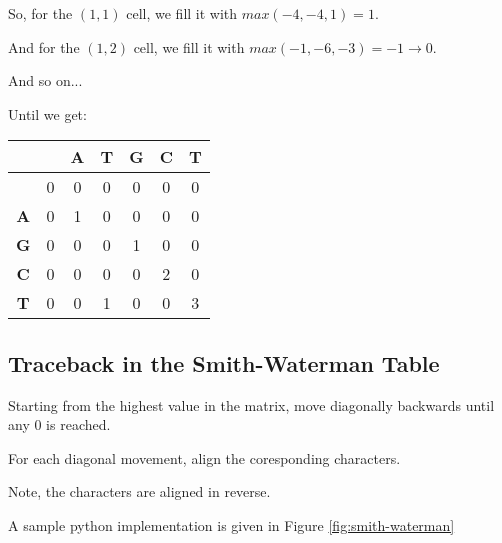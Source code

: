 So, for the $(1,1)$ cell, we fill it with $max(-4,-4,1) = 1$.

And for the $(1,2)$ cell, we fill it with $max(-1,-6,-3) = -1 \rightarrow 0$.

And so on...

Until we get:

\begin{table}[htbp]
    \centering
    \begin{tabular}{|c|c|c|c|c|c|c|}
        \hline
          &  & \textbf{A} & \textbf{T} & \textbf{G} & \textbf{C} & \textbf{T} \\
        \hline
        & 0 & 0 & 0 & 0 & 0 & 0 \\
        \hline
        \textbf{A} & 0 & 1 & 0 & 0 & 0 & 0 \\
        \hline
        \textbf{G} & 0 & 0 & 0 & 1 & 0 & 0 \\
        \hline
        \textbf{C} & 0 & 0 & 0 & 0 & 2 & 0 \\
        \hline
        \textbf{T} & 0 & 0 & 1 & 0 & 0 & 3 \\
        \hline
    \end{tabular}
\end{table}

\subsection{Traceback in the Smith-Waterman Table}

Starting from the highest value in the matrix, move diagonally backwards until any 0 is reached.

For each diagonal movement, align the coresponding characters.

Note, the characters are aligned in reverse.

A sample python implementation is given in Figure \ref{fig:smith-waterman}

